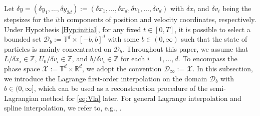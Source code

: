 \documentclass[11pt,reqno]{amsproc}
\newcommand{\R}{\mathbb{R}}
\numberwithin{equation}{section}
\begin{document}
Let $\delta y=(\delta y_1,\ldots,\delta y_{2d}):=(\delta x_1,\ldots,\delta x_d,\delta v_1,\ldots,\delta v_d)$
 with
$\delta x_i$ and $\delta v_i$ being the stepsizes for the $i$th components of position and velocity coordinates, respectively. 
Under Hypothesis \ref{Hyp:initial}, for any fixed $t\in[0,T]$, it is possible to select a bounded set $\mathscr{D}_b:=\mathbb{T}^d\times[-b,b]^d$ with some $b\in(0,\infty)$  such that the state of particles is mainly concentrated on $\mathscr{D}_b$. Throughout this paper, we assume that $L/\delta x_i\in\mathbb{Z}$, $U_0/\delta v_i\in\mathbb{Z}$, and $b/\delta v_i\in\mathbb{Z}$ for each $i=1,\ldots,d$.
To encompass the phase space $\mathscr{X}:=\mathbb{T}^d\times\R^d$, we adopt the convention $\mathscr{D}_\infty:=\mathscr{X}$.
In this subsection, we introduce the Lagrange first-order interpolation on the domain $\mathscr{D}_b$ with $b\in(0,\infty]$, which can be used as a reconstruction procedure of the semi-Lagrangian method for \eqref{eq:Vla} later.
 For general Lagrange interpolation and spline interpolation, we refer to, e.g., \cite[section 5]{BM08}. 
 
\end{document}
